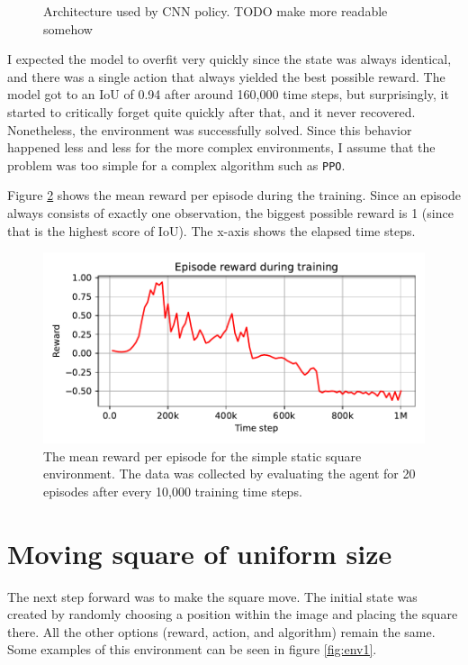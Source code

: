 \documentclass[
  digital,     %
  oneside,     %
  nosansbold,  %
  nocolorbold, %
  lof,         %
  lot,         %
]{fithesis4}
\begin{document}
\begin{figure}
    \caption{Architecture used by CNN policy. TODO make more readable somehow}
    \label{fig:cnn_policy}
\end{figure}

I expected the model to overfit very quickly since the state was always identical, and there was a single action that always yielded the best possible reward. The model got to an IoU of 0.94 after around 160,000 time steps, but surprisingly, it started to critically forget quite quickly after that, and it never recovered. Nonetheless, the environment was successfully solved. Since this behavior happened less and less for the more complex environments, I assume that the problem was too simple for a complex algorithm such as \texttt{PPO}.

Figure \ref{fig:v0_rew} shows the mean reward per episode during the training. Since an episode always consists of exactly one observation, the biggest possible reward is 1 (since that is the highest score of IoU). The x-axis shows the elapsed time steps.

\begin{figure}
    \includegraphics[width=1\linewidth]{graphs/v0.pdf}
    \caption{The mean reward per episode for the simple static square environment. The data was collected by evaluating the agent for 20 episodes after every 10,000 training time steps.}
    \label{fig:v0_rew}
\end{figure}

\section{Moving square of uniform size}
The next step forward was to make the square move. The initial state was created by randomly choosing a position within the image and placing the square there. All the other options (reward, action, and algorithm) remain the same. Some examples of this environment can be seen in figure \ref{fig:env1}.
\end{document}
